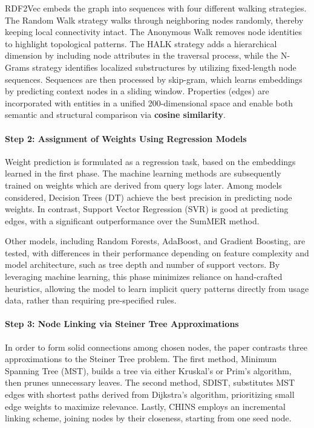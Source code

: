 \documentclass[article,submit,pdftex,moreauthors]{Definitions/mdpi}
\begin{document}
RDF2Vec embeds the graph into sequences with four different walking strategies. The Random Walk strategy walks through neighboring nodes randomly, thereby keeping local connectivity intact. The Anonymous Walk removes node identities to highlight topological patterns. The HALK strategy adds a hierarchical dimension by including node attributes in the traversal process, while the N-Grams strategy identifies localized substructures by utilizing fixed-length node sequences.
Sequences are then processed by skip-gram, which learns embeddings by predicting context nodes in a sliding window. Properties (edges) are incorporated with entities in a unified 200-dimensional space and enable both semantic and structural comparison via \textbf{cosine similarity}.

\paragraph{Step 2: Assignment of Weights Using Regression Models}
Weight prediction is formulated as a regression task, based on the embeddings learned in the first phase. The machine learning methods are subsequently trained on weights which are derived from query logs later. Among models considered, Decision Trees (DT) achieve the best precision in predicting node weights. In contrast, Support Vector Regression (SVR) is good at predicting edges, with a significant outperformance over the SumMER method.

Other models, including Random Forests, AdaBoost, and Gradient Boosting, are tested, with differences in their performance depending on feature complexity and model architecture, such as tree depth and number of support vectors. By leveraging machine learning, this phase minimizes reliance on hand-crafted heuristics, allowing the model to learn implicit query patterns directly from usage data, rather than requiring pre-specified rules.

\paragraph{Step 3: Node Linking via Steiner Tree Approximations} In order to form solid connections among chosen nodes, the paper contrasts three approximations to the Steiner Tree problem. The first method, Minimum Spanning Tree (MST), builds a tree via either Kruskal's or Prim's algorithm, then prunes unnecessary leaves. The second method, SDIST, substitutes MST edges with shortest paths derived from Dijkstra's algorithm, prioritizing small edge weights to maximize relevance. Lastly, CHINS employs an incremental linking scheme, joining nodes by their closeness, starting from one seed node.
\end{document}
